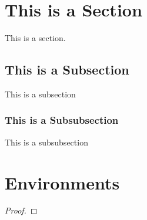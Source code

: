 \section{This is a Section}

This is a section.

\subsection{This is a Subsection}

This is a subsection

\subsubsection{This is a Subsubsection}

This is a subsubsection

\section{Environments}

\begin{theorem}
    \lipsum[1]
\end{theorem}

\begin{proof}
    \lipsum[2]
\end{proof}

\begin{lemma}
    \lipsum[3]
\end{lemma}

\begin{corollary}
    \lipsum[4]
\end{corollary}

\begin{proposition}
    \lipsum[5]
\end{proposition}

\begin{statement*}
    \lipsum[6]
\end{statement*}

\begin{conjecture*}
    \lipsum[7]
\end{conjecture*}

\begin{definition**}
    \lipsum[8]
\end{definition**}

\begin{problem**}
    \lipsum[9]
\end{problem**}